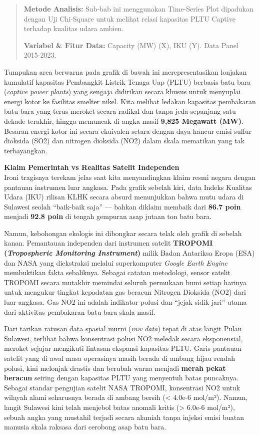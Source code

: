 \documentclass[
]{article}
\begin{document}
\begin{quote}
\textbf{Metode Analisis:} Sub-bab ini menggunakan Time-Series Plot
dipadukan dengan Uji Chi-Square untuk melihat relasi kapasitas PLTU
Captive terhadap kualitas udara ambien.

\textbf{Variabel \& Fitur Data:} Capacity (MW) (X), IKU (Y). Data Panel
2015-2023.
\end{quote}

Tumpukan area berwarna pada grafik di bawah ini merepresentasikan
lonjakan kumulatif kapasitas Pembangkit Listrik Tenaga Uap (PLTU)
berbasis batu bara (\emph{captive power plants}) yang sengaja didirikan
secara khusus untuk menyuplai energi kotor ke fasilitas smelter nikel.
Kita melihat ledakan kapasitas pembakaran batu bara yang terus meroket
secara radikal dan tanpa jeda sepanjang satu dekade terakhir, hingga
memuncak di angka masif \textbf{9,825 Megawatt (MW)}. Besaran energi
kotor ini secara ekuivalen setara dengan daya hancur emisi sulfur
dioksida (SO2) dan nitrogen dioksida (NO2) dalam skala mematikan yang
tak terbayangkan.

\textbf{Klaim Pemerintah vs Realitas Satelit Independen}\\
Ironi tragisnya terekam jelas saat kita menyandingkan klaim resmi negara
dengan pantauan instrumen luar angkasa. Pada grafik sebelah kiri, data
Indeks Kualitas Udara (IKU) rilisan KLHK secara absurd menunjukkan bahwa
mutu udara di Sulawesi seolah ``baik-baik saja'' --- bahkan diklaim
membaik dari \textbf{86.7 poin} menjadi \textbf{92.8 poin} di tengah
gempuran asap jutaan ton batu bara.

Namun, kebohongan ekologis ini dibongkar secara telak oleh grafik di
sebelah kanan. Pemantauan independen dari instrumen satelit
\textbf{TROPOMI (\emph{Tropospheric Monitoring Instrument})} milik Badan
Antariksa Eropa (ESA) dan NASA yang diekstraksi melalui superkomputer
\emph{Google Earth Engine} membuktikan fakta sebaliknya. Sebagai catatan
metodologi, sensor satelit TROPOMI secara mutakhir memindai seluruh
permukaan bumi setiap harinya untuk mengukur tingkat kepadatan gas
beracun Nitrogen Dioksida (NO2) dari luar angkasa. Gas NO2 ini adalah
indikator polusi dan ``jejak sidik jari'' utama dari aktivitas
pembakaran batu bara skala masif.

Dari tarikan ratusan data spasial murni (\emph{raw data}) tepat di atas
langit Pulau Sulawesi, terlihat bahwa konsentrasi polusi NO2 meledak
secara eksponensial, meroket sejajar mengikuti lintasan ekspansi
kapasitas PLTU. Garis pantauan satelit yang di awal masa operasinya
masih berada di ambang hijau rendah polusi, kini melonjak drastis dan
berubah warna menjadi \textbf{merah pekat beracun} seiring dengan
kapasitas PLTU yang menyentuh batas puncaknya. Sebagai standar pengujian
satelit NASA TROPOMI, konsentrasi NO2 untuk wilayah alami seharusnya
berada di ambang bersih (\textless{} 4.0e-6 mol/m²). Namun, langit
Sulawesi kini telah menjebol batas anomali kritis (\textgreater{} 6.0e-6
mol/m²), sebuah angka yang mustahil terjadi secara alamiah tanpa injeksi
emisi buatan manusia skala raksasa dari cerobong asap batu bara.
\end{document}
